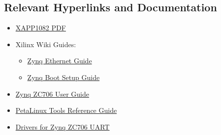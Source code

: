 \documentclass[12pt]{report}
\begin{document}
\subsection{Relevant Hyperlinks and Documentation}
\begin{itemize}
  \item \href{http://www.xilinx.com/support/documentation/application_notes/xapp1082-zynq-eth.pdf}{XAPP1082 PDF}
  \item Xilinx Wiki Guides:
    \begin{itemize}
    \item \href{http://www.wiki.xilinx.com/Zynq+PL+Ethernet}{Zynq Ethernet Guide}
    \item \href{http://www.wiki.xilinx.com/Prepare+Boot+Medium}{Zynq Boot Setup Guide}
    \end{itemize}
  \item \href{http://www.xilinx.com/support/documentation/boards_and_kits/zc706/ug954-zc706-eval-board-xc7z045-ap-soc.pdf}{Zynq ZC706 User Guide}
  \item \href{http://www.xilinx.com/support/documentation/sw_manuals/petalinux2014_4/ug1144-petalinux-tools-reference-guide.pdf}{PetaLinux Tools Reference Guide}
  \item \href{http://www.silabs.com/products/mcu/Pages/USBtoUARTBridgeVCPDrivers.aspx}{Drivers for Zynq ZC706 UART}
\end{itemize}
\end{document}
